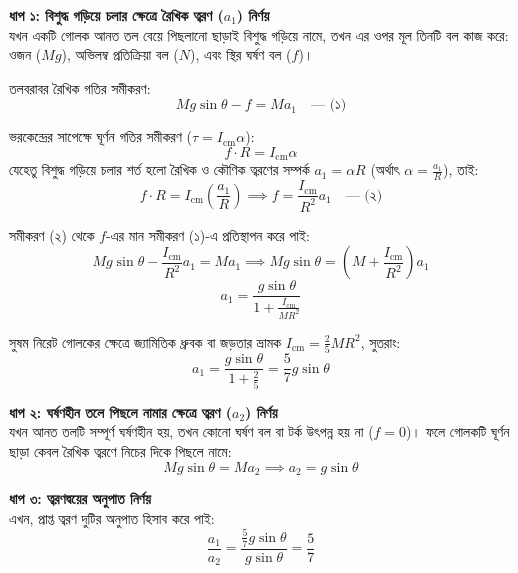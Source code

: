 \documentclass[12pt, a4paper]{article}
\begin{document}
\begin{tcolorbox}[solutionbox={সমাধান (Solution)}]
    \noindent
    \textbf{ধাপ ১: বিশুদ্ধ গড়িয়ে চলার ক্ষেত্রে রৈখিক ত্বরণ ($a_1$) নির্ণয়} \\
    যখন একটি গোলক আনত তল বেয়ে পিছলানো ছাড়াই বিশুদ্ধ গড়িয়ে নামে, তখন এর ওপর মূল তিনটি বল কাজ করে: ওজন ($Mg$), অভিলম্ব প্রতিক্রিয়া বল ($N$), এবং স্থির ঘর্ষণ বল ($f$)।
    
    তলবরাবর রৈখিক গতির সমীকরণ:
    \[ M g \sin\theta - f = M a_1 \quad \text{--- (১)} \]
    
    ভরকেন্দ্রের সাপেক্ষে ঘূর্ণন গতির সমীকরণ ($\tau = I_{\text{cm}} \alpha$):
    \[ f \cdot R = I_{\text{cm}} \alpha \]
    যেহেতু বিশুদ্ধ গড়িয়ে চলার শর্ত হলো রৈখিক ও কৌণিক ত্বরণের সম্পর্ক $a_1 = \alpha R$ (অর্থাৎ $\alpha = \frac{a_1}{R}$), তাই:
    \[ f \cdot R = I_{\text{cm}} \left(\frac{a_1}{R}\right) \implies f = \frac{I_{\text{cm}}}{R^2} a_1 \quad \text{--- (২)} \]

    সমীকরণ (২) থেকে $f$-এর মান সমীকরণ (১)-এ প্রতিস্থাপন করে পাই:
    \[ M g \sin\theta - \frac{I_{\text{cm}}}{R^2} a_1 = M a_1 \implies M g \sin\theta = \left(M + \frac{I_{\text{cm}}}{R^2}\right) a_1 \]
    \[ a_1 = \frac{g \sin\theta}{1 + \frac{I_{\text{cm}}}{M R^2}} \]

    সুষম নিরেট গোলকের ক্ষেত্রে জ্যামিতিক ধ্রুবক বা জড়তার ভ্রামক $I_{\text{cm}} = \frac{2}{5} M R^2$, সুতরাং:
    \[ a_1 = \frac{g \sin\theta}{1 + \frac{2}{5}} = \frac{5}{7} g \sin\theta \]

    \vspace{0.5em}
    \noindent
    \textbf{ধাপ ২: ঘর্ষণহীন তলে পিছলে নামার ক্ষেত্রে ত্বরণ ($a_2$) নির্ণয়} \\
    যখন আনত তলটি সম্পূর্ণ ঘর্ষণহীন হয়, তখন কোনো ঘর্ষণ বল বা টর্ক উৎপন্ন হয় না ($f = 0$)। ফলে গোলকটি ঘূর্ণন ছাড়া কেবল রৈখিক ত্বরণে নিচের দিকে পিছলে নামে:
    \[ M g \sin\theta = M a_2 \implies a_2 = g \sin\theta \]

    \vspace{0.5em}
    \noindent
    \textbf{ধাপ ৩: ত্বরণদ্বয়ের অনুপাত নির্ণয়} \\
    এখন, প্রাপ্ত ত্বরণ দুটির অনুপাত হিসাব করে পাই:
    \[ \frac{a_1}{a_2} = \frac{\frac{5}{7} g \sin\theta}{g \sin\theta} = \frac{5}{7} \]
\end{tcolorbox}
\end{document}
